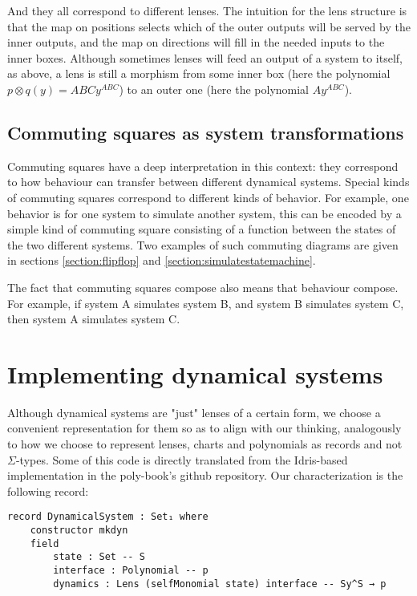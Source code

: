 And they all correspond to different lenses. The intuition for the lens structure is that the map on positions selects which of the outer outputs will be served by the inner outputs, and the map on directions will fill in the needed inputs to the inner boxes. Although sometimes lenses will feed an output of a system to itself, as above, a lens is still a morphism from some inner box (here the polynomial $p \otimes q(y) = ABCy^{ABC}$) to an outer one (here the polynomial $Ay^{ABC}$).

\subsection{Commuting squares as system transformations}
Commuting squares have a deep interpretation in this context: they correspond to how behaviour can transfer between different dynamical systems.
Special kinds of commuting squares correspond to different kinds of behavior.
For example, one behavior is for one system to simulate another system, this can be encoded by a simple kind of commuting square consisting of a function between the states of the two different systems.
Two examples of such commuting diagrams are given in sections \ref{section:flipflop} and \ref{section:simulatestatemachine}.

The fact that commuting squares compose also means that behaviour compose.
For example, if system A simulates system B, and system B simulates system C, then system A simulates system C. 


\section{Implementing dynamical systems}

Although dynamical systems are "just" lenses of a certain form, we choose a convenient representation for them so as to align with our thinking, analogously to how we choose to represent lenses, charts and polynomials as records and not $\Sigma$-types. Some of this code is directly translated from the Idris-based implementation in the poly-book's github repository. Our characterization is the following record:
\begin{verbatim}
record DynamicalSystem : Set₁ where
    constructor mkdyn
    field
        state : Set -- S
        interface : Polynomial -- p
        dynamics : Lens (selfMonomial state) interface -- Sy^S → p
\end{verbatim}

